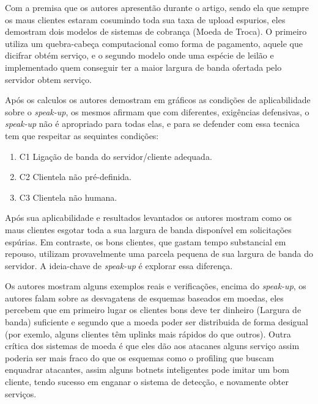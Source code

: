 \documentclass[a4paper,12pt]{article}
\begin{document}
\vspace{0.3cm}


Com a premisa que os autores apresentão durante o artigo, sendo ela que sempre os maus clientes estaram cosumindo toda sua taxa de upload espurios, eles demostram dois modelos de sistemas de cobrança (Moeda de Troca). O primeiro utiliza um quebra-cabeça computacional como forma de pagamento, aquele que dicifrar obtém serviço, e o segundo modelo onde uma espécie de leilão e implementado quem conseguir ter a maior largura de banda ofertada pelo servidor obtem serviço. 

\vspace{0.3cm}


Após os calculos os autores demostram em gráficos as condições de aplicabilidade sobre o \textit{speak-up}, os mesmos afirmam que com diferentes, exigências defensivas, o \textit{speak-up} não é apropriado para todas elas, e para se defender com essa tecnica tem que respeitar as sequintes condições: 

\begin{enumerate}
	\item{C1} Ligação de banda do servidor/cliente adequada.

	\item{C2} Clientela não pré-definida.

	\item{C3} Clientela não humana.

\end{enumerate}
 
 \vspace{0.3cm}
 
 Após sua aplicabilidade e resultados levantados os autores mostram como os maus clientes esgotar toda a sua largura de banda disponível em solicitações espúrias. Em contraste, os bons clientes, que gastam tempo substancial em repouso, utilizam provavelmente uma parcela pequena de sua largura de banda do servidor. A ideia-chave de \textit{speak-up} é explorar essa diferença.
 \vspace{0.3cm}
 
 \vspace{0.3cm}
 
 Os autores mostram alguns exemplos reais e verificações, encima do \textit{speak-up}, os autores falam sobre as desvagatens de esquemas baseados em moedas, eles percebem que em primeiro lugar os clientes bons deve ter dinheiro (Largura de banda) suficiente e segundo que a moeda poder ser distribuida de forma desigual (por exemlo, alguns clientes têm uplinks mais rápidos do que outros). Outra crítica dos sistemas de moeda é que eles dão aos atacanes alguns serviço assim poderia ser mais fraco do que os esquemas como o profiling que buscam enquadrar atacantes, assim alguns botnets inteligentes pode imitar um bom cliente, tendo sucesso em enganar o sistema de detecção, e novamente obter serviços.
 
\end{document}
